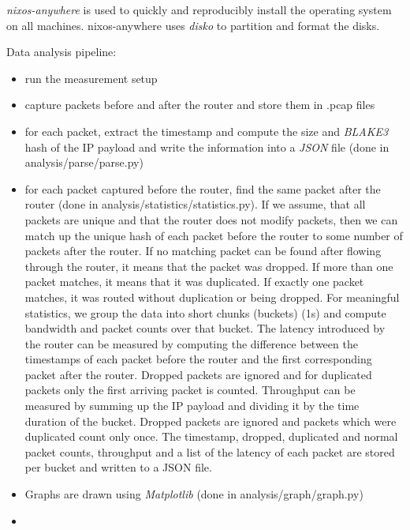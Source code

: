
\textit{nixos-anywhere} \cite{nixos-anywhere} is used to quickly and reproducibly install the operating system on all machines.
nixos-anywhere uses \textit{disko} \cite{disko} to partition and format the disks.



Data analysis pipeline:
\begin{itemize}
  \item run the measurement setup
  \item capture packets before and after the router and store them in .pcap files
  \item for each packet, extract the timestamp and compute the size and \textit{BLAKE3} \cite{wiki:BLAKE3} hash of the IP payload and write the information into a \textit{JSON} \cite{wiki:JSON} file (done in analysis/parse/parse.py)
  \item for each packet captured before the router, find the same packet after the router (done in analysis/statistics/statistics.py). If we assume, that all packets are unique and that the router does not modify packets, then we can match up the unique hash of each packet before the router to some number of packets after the router. If no matching packet can be found after flowing through the router, it means that the packet was dropped. If more than one packet matches, it means that it was duplicated. If exactly one packet matches, it was routed without duplication or being dropped. For meaningful statistics, we group the data into short chunks (buckets) (1s) and compute bandwidth and packet counts over that bucket. The latency introduced by the router can be measured by computing the difference between the timestamps of each packet before the router and the first corresponding packet after the router. Dropped packets are ignored and for duplicated packets only the first arriving packet is counted. Throughput can be measured by summing up the IP payload  and dividing it by the time duration of the bucket. Dropped packets are ignored and packets which were duplicated count only once. The timestamp, dropped, duplicated and normal packet counts, throughput and a list of the latency of each packet are stored per bucket and written to a JSON file.
  \item Graphs are drawn using \textit{Matplotlib} \cite{Matplotlib} (done in analysis/graph/graph.py)
  \item {}
\end{itemize}


